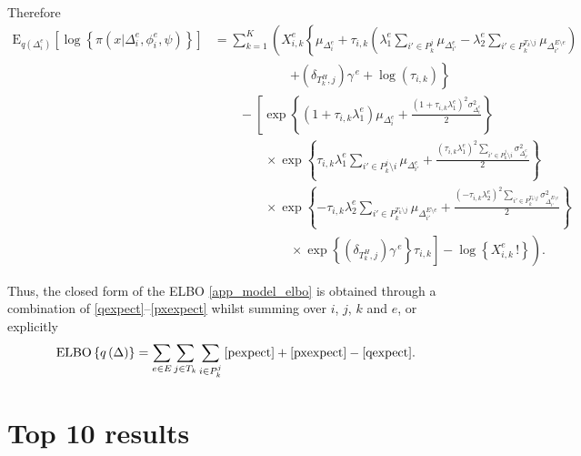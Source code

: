 \documentclass[11pt,a4paper]{article}
\newcommand{\expect}{\textrm{E}}
\newcommand{\elbo}{\textrm{ELBO}}
\begin{document}
Therefore 
\begin{align}
\expect_{q\left(\Delta_i^{e}\right)}\left[\log\left\{\pi\left(x\Big\vert\Delta_i^{e},\phi_i^{e},\psi\right)\right\}\right]&= \sum_{k=1}^K\left(X_{i,k}^{e}\left\{\mu_{\Delta_i^{e}} + \tau_{i,k}\left(\lambda_1^e\sum_{i'\in P_k^j}\mu_{\Delta_{i'}^{e}} - \lambda_2^e\sum_{i'\in P_k^{T_k\setminus j}}\mu_{\Delta_{i'}^{E\setminus e}}\right) \right.\right.\nonumber \\
&\qquad\qquad\qquad \left. + \left(\delta_{T_k^H,j}\right)\gamma^{\,e} + \log\left(\tau_{i,k}\right) \right\} \nonumber\\
&\qquad - \left[\exp\left\{\left(1 + \tau_{i,k}\lambda_1^e\right)\mu_{\Delta_i^{e}} + \frac{\left(1 + \tau_{i,k}\lambda_1^e\right)^2\sigma_{\Delta_i^{e}}^2}{2} \right\} \right.\nonumber\\
&\left.\qquad\qquad\times\exp\left\{\tau_{i,k}\lambda_1^e\sum_{i'\in P_k^j\setminus i}\mu_{\Delta_{i'}^{e}} + \frac{\left(\tau_{i,k}\lambda_1^e\right)^2\displaystyle\sum_{i'\in P_k^j\setminus i}\sigma_{\Delta_{i'}^{e}}^2}{2}\right\} \right.\nonumber\\
&\left.\qquad\qquad\times \exp\left\{-\tau_{i,k}\lambda_2^e\sum_{i'\in P_k^{T_k\setminus j}}\mu_{\Delta_{i'}^{E\setminus e}} + \frac{\left(-\tau_{i,k}\lambda_2^e\right)^2\displaystyle\sum_{i'\in P_k^{T_k\setminus j}}\sigma_{\Delta_{i'}^{E\setminus e}}^2 }{2} \right\} \right.\nonumber\\
&\left.\left.\qquad\qquad\qquad\times\exp\left\{\left(\delta_{T_k^H,j}\right)\gamma^{\,e} \right\}\tau_{i,k}\right] - \log{\left\{X_{i,k}^{e}\,! \right\}}\right). \label{pxexpect}
\end{align}

Thus, the closed form of the ELBO \eqref{app_model_elbo} is obtained through 
a combination of \eqref{qexpect}--\eqref{pxexpect} whilst summing over 
$i$, $j$, $k$ and $e$, or explicitly
\begin{equation}
\elbo\left\{q\left(\Delta\right)\right\} = \sum_{e\in E}\sum_{j\in T_k}\sum_{i\in P_k^j} \textrm{\eqref{pexpect}} + \textrm{\eqref{pxexpect}} - \textrm{\eqref{qexpect}}.
\end{equation}










\section{Top 10 results} \label{app_top10}
\end{document}
